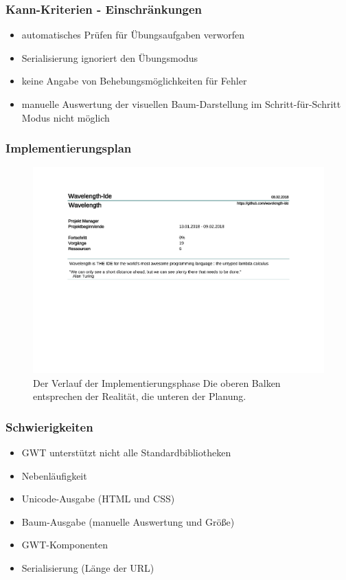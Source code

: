 \documentclass[10pt]{beamer}
\begin{document}
\begin{frame}
\frametitle{Kann-Kriterien - \alert{Einschränkungen}}
\begin{itemize}
\item automatisches Prüfen für Übungsaufgaben verworfen
\item Serialisierung ignoriert den Übungsmodus
\item keine Angabe von Behebungsmöglichkeiten für Fehler
\item manuelle Auswertung der visuellen Baum-Darstellung im Schritt-für-Schritt Modus nicht möglich
\end{itemize}
\end{frame}

\begin{frame}
\frametitle{Implementierungsplan}
\begin{figure}[h]
\includegraphics[trim={0, 7cm, 0, 0}, clip, scale=0.4, page=4]{Implementierungsplan/Implementierungsplan.pdf}
\caption[caption]{Der Verlauf der Implementierungsphase 
\newline
Die oberen Balken entsprechen der Realität, die unteren der Planung.}
\end{figure}
\end{frame}

\begin{frame}
\frametitle{Schwierigkeiten}
\begin{itemize}
\item GWT unterstützt nicht alle Standardbibliotheken
\item Nebenläufigkeit
\item Unicode-Ausgabe (HTML und CSS)
\item Baum-Ausgabe (manuelle Auswertung und Größe)
\item GWT-Komponenten
\item Serialisierung (Länge der URL)
\end{itemize}
\end{frame}
\end{document}
